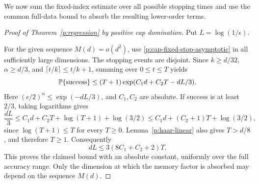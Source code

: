 We now sum the fixed-index estimate over all possible stopping times
and use the common full-data bound to absorb the resulting lower-order
terms.

\begin{proof}[Proof of Theorem~\ref{p:regression} by positive cap domination]
Put $L=\log(1/\epsilon)$.

For the given sequence $M(d)=o(d^2)$, use
\eqref{p:cap-fixed-stop-asymptotic} in all sufficiently large dimensions.
The stopping events are disjoint. Since $k\ge d/32$, $\alpha\ge d/3$,
and $\lceil t/k\rceil\le t/k+1$, summing over $0\le t\le T$ yields
\begin{equation}\label{p:cap-total-success}
 \mathbb P\{\text{success}\}
 \le(T+1)\exp(C_1d+C_2T-dL/3).
\end{equation}
Here $(\epsilon/2)^\alpha\le\exp(-dL/3)$, and $C_1,C_2$ are absolute.
If success is at least $2/3$, taking logarithms gives
\[
 \frac{dL}{3}
 \le C_1d+C_2T+\log(T+1)+\log(3/2)
 \le C_1d+(C_2+1)T+\log(3/2),
\]
since $\log(T+1)\le T$ for every $T\ge0$.
Lemma~\ref{p:haar-linear} also gives $T>d/8$, and therefore $T\ge1$.
Consequently
\[
 dL\le3(8C_1+C_2+2)T.
\]
This proves the claimed bound with an absolute constant, uniformly over
the full accuracy range. Only the dimension at which the memory factor
is absorbed may depend on the sequence $M(d)$.
\end{proof}

